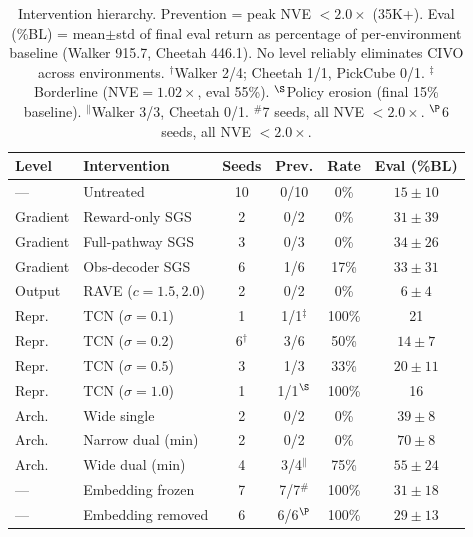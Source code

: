 \begin{table}[t]
\centering
\caption{Intervention hierarchy. Prevention = peak NVE $< 2.0\times$ (35K+). Eval (\%BL) = mean${\pm}$std of final eval return as percentage of per-environment baseline (Walker 915.7, Cheetah 446.1). No level reliably eliminates CIVO across environments.
$^\dagger$Walker 2/4; Cheetah 1/1, PickCube 0/1.
$^\ddagger$Borderline (NVE${=}1.02\times$, eval 55\%).
$^\S$Policy erosion (final 15\% baseline).
$^\|$Walker 3/3, Cheetah 0/1.
$^\#$7 seeds, all NVE $< 2.0\times$.
$^\P$6 seeds, all NVE $< 2.0\times$.}
\label{tab:intervention_hierarchy}
\footnotesize
\setlength{\tabcolsep}{3pt}
\begin{tabular}{llcccc}
\toprule
\textbf{Level} & \textbf{Intervention} & \textbf{Seeds} & \textbf{Prev.} & \textbf{Rate} & \textbf{Eval (\%BL)} \\
\midrule
--- & Untreated & 10 & 0/10 & 0\% & $15{\pm}10$ \\
\midrule
Gradient & Reward-only SGS & 2 & 0/2 & 0\% & $31{\pm}39$ \\
Gradient & Full-pathway SGS & 3 & 0/3 & 0\% & $34{\pm}26$ \\
Gradient & Obs-decoder SGS & 6 & 1/6 & 17\% & $33{\pm}31$ \\
\midrule
Output & RAVE ($c{=}1.5{,}2.0$) & 2 & 0/2 & 0\% & $6{\pm}4$ \\
\midrule
Repr. & TCN ($\sigma{=}0.1$) & 1 & 1/1$^\ddagger$ & 100\% & 21 \\
Repr. & TCN ($\sigma{=}0.2$) & 6$^\dagger$ & 3/6 & 50\% & $14{\pm}7$ \\
Repr. & TCN ($\sigma{=}0.5$) & 3 & 1/3 & 33\% & $20{\pm}11$ \\
Repr. & TCN ($\sigma{=}1.0$) & 1 & 1/1$^\S$ & 100\% & 16 \\
\midrule
Arch. & Wide single & 2 & 0/2 & 0\% & $39{\pm}8$ \\
Arch. & Narrow dual (min) & 2 & 0/2 & 0\% & $70{\pm}8$ \\
Arch. & Wide dual (min) & 4 & 3/4$^\|$ & 75\% & $55{\pm}24$ \\
\midrule
--- & Embedding frozen & 7 & 7/7$^\#$ & 100\% & $31{\pm}18$ \\
--- & Embedding removed & 6 & 6/6$^\P$ & 100\% & $29{\pm}13$ \\
\bottomrule
\end{tabular}
\end{table}

